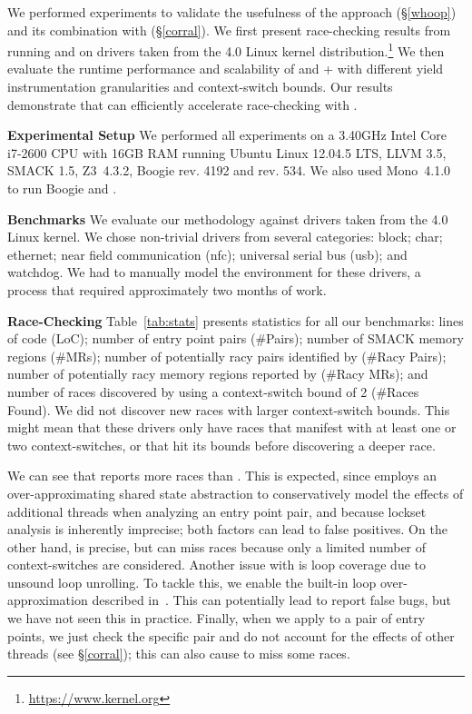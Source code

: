 We performed experiments to validate the usefulness of the \whoop approach (\S\ref{whoop}) and its combination with \corral (\S\ref{corral}). We first present race-checking results from running \whoop and \corral on \sizeOfBenchmarks drivers taken from the 4.0 Linux kernel distribution.\footnote{\url{https://www.kernel.org}} We then evaluate the runtime performance and scalability of \corral and \whoop + \corral with different yield instrumentation granularities and context-switch bounds.
Our results demonstrate that \whoop can efficiently accelerate race-checking with \corral.

\noindent\textbf{Experimental Setup }
%
We performed all experiments on a 3.40GHz Intel Core i7-2600 CPU with 16GB RAM running Ubuntu Linux 12.04.5 LTS, LLVM 3.5, SMACK 1.5, Z3~4.3.2, Boogie rev. 4192 and \corral rev. 534. We also used Mono~4.1.0 to run Boogie and \corral.

\noindent\textbf{Benchmarks }
%
We evaluate our methodology against \sizeOfBenchmarks drivers taken from the 4.0 Linux kernel. We chose non-trivial drivers from several categories: block; char; ethernet; near field communication (nfc); universal serial bus (usb); and watchdog. We had to manually model the environment for these drivers, a process that required approximately two months of work.

\noindent\textbf{Race-Checking }
%
Table~\ref{tab:stats} presents statistics for all our benchmarks: lines of code (LoC); number of entry point pairs (\#Pairs); number of SMACK memory regions (\#MRs); number of potentially racy pairs identified by \whoop (\#Racy Pairs); number of potentially racy memory regions reported by \whoop (\#Racy MRs); and number of races discovered by \corral using a context-switch bound of 2 (\#Races Found). We did not discover new races with larger context-switch bounds. This might mean that these drivers only have races that manifest with at least one or two context-switches, or that \corral hit its bounds before discovering a deeper race.

We can see that \whoop reports more races than \corral. This is expected, since \whoop employs an over-approximating shared state abstraction to conservatively model the effects of additional threads when analyzing an entry point pair, and because lockset analysis is inherently imprecise; both factors can lead to false positives.  On the other hand, \corral is precise, but can miss races because only a limited number of context-switches are considered.  Another issue with \corral is loop coverage due to unsound loop unrolling. To tackle this, we enable the built-in loop over-approximation described in~\cite{lal2014powering}. This can potentially lead \corral to report false bugs, but we have not seen this in practice. Finally, when we apply \corral to a pair of entry points, we just check the specific pair and do not account for the effects of other threads (see \S\ref{corral}); this can also cause \corral to miss some races.

